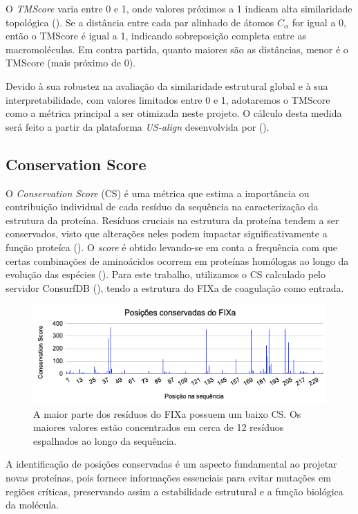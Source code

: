 O \textit{TMScore} varia entre 0 e 1, onde valores próximos a 1 indicam alta similaridade topológica (\cite{tmscore}).
Se a distância entre cada par alinhado de átomos \(C_\alpha\) for igual a 0, então o TMScore é igual a 1, indicando sobreposição completa 
entre as macromoléculas. Em contra partida, quanto maiores são as distâncias, menor é o TMScore (mais próximo de 0).

Devido à sua robustez na avaliação da similaridade estrutural global e à sua interpretabilidade,
com valores limitados entre 0 e 1, adotaremos o TMScore como a métrica principal a ser otimizada neste projeto.
O cálculo desta medida será feito a partir da plataforma \textit{US-align} desenvolvida por (\cite{USalign}).


\subsection{Conservation Score}
\label{subsection:CS}
O \textit{Conservation Score} (CS) é uma métrica que estima a importância ou 
contribuição individual de cada resíduo da sequência na caracterização da estrutura da proteína.
Resíduos cruciais na estrutura da proteína tendem a ser conservados,
visto que alterações neles podem impactar significativamente a função proteíca (\cite{CS}). 
O \textit{score} é obtido levando-se em conta a frequência com que certas combinações de aminoácidos 
ocorrem em proteínas homólogas ao longo da evolução das espécies (\cite{Eddy}). 
Para este trabalho, utilizamos o CS calculado pelo servidor ConsurfDB (\cite{ConsurfDB}),
tendo a estrutura do FIXa de coagulação como entrada. 

\begin{figure}[H]
    \centering
    \includegraphics[width=.8\textwidth]{figuras/ConservationScore.png}
    \caption[FIXa Conservation Score]{A maior parte dos resíduos do FIXa possuem um baixo CS. Os maiores valores estão concentrados em cerca de 12 resíduos 
    espalhados ao longo da sequência.}
  \end{figure}

A identificação de posições conservadas é um aspecto fundamental ao projetar novas proteínas,
pois fornece informações essenciais para evitar mutações em regiões críticas,
preservando assim a estabilidade estrutural e a função biológica da molécula.

